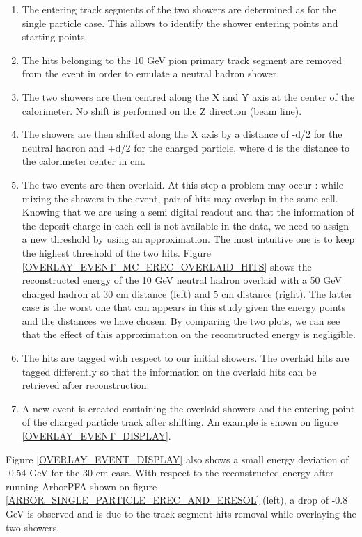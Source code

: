 \documentclass[cits]{JINST}
\begin{document}
\begin{enumerate}
  \item The entering track segments of the two showers are determined as for the single particle case. This allows to identify the shower entering points and starting points.
  \item The hits belonging to the 10 GeV pion primary track segment are removed from the event in order to emulate a neutral hadron shower.
  \item The two showers are then centred along the X and Y axis at the center of the calorimeter. No shift is performed on the Z direction (beam line).
  \item The showers are then shifted along the X axis by a distance of -d/2 for the neutral hadron and +d/2 for the charged particle, where d is the distance to the calorimeter center in cm.
  \item The two events are then overlaid. At this step a problem may occur : while mixing the showers in the event, pair of hits may overlap in the same cell. Knowing that we are using a semi digital readout and that the information of the deposit charge in each cell is not available in the data, we need to assign a new threshold by using an approximation. The most intuitive one is to keep the highest threshold of the two hits. Figure \ref{OVERLAY_EVENT_MC_EREC_OVERLAID_HITS} shows the reconstructed energy of the 10 GeV neutral hadron overlaid with a 50 GeV charged hadron at 30 cm distance (left) and 5 cm distance (right). The latter case is the worst one that can appears in this study given the energy points and the distances we have chosen. By comparing the two plots, we can see that the effect of this approximation on the reconstructed energy is negligible.
  \item The hits are tagged with respect to our initial showers. The overlaid hits are tagged differently so that the information on the overlaid hits can be retrieved after reconstruction.
  \item A new event is created containing the overlaid showers and the entering point of the charged particle track after shifting. An example is shown on figure \ref{OVERLAY_EVENT_DISPLAY}.
\end{enumerate}

Figure \ref{OVERLAY_EVENT_DISPLAY} also shows a small energy deviation of -0.54 GeV for the 30 cm case. With respect to the reconstructed energy after running ArborPFA shown on figure \ref{ARBOR_SINGLE_PARTICLE_EREC_AND_ERESOL} (left), a drop of -0.8 GeV is observed and is due to the track segment hits removal while overlaying the two showers. 
\end{document}

